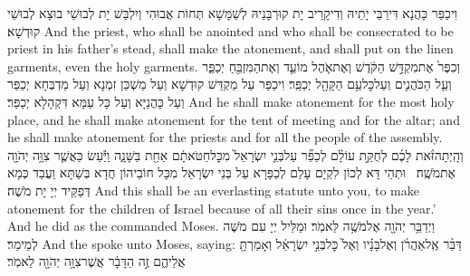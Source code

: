 {וִיכַפַּר כָּהֲנָא דִּירַבֵּי יָתֵיהּ וְדִיקָרֵיב יָת קוּרְבָּנֵיהּ לְשַׁמָּשָׁא תְּחוֹת אֲבוּהִי וְיִלְבַּשׁ יָת לְבוּשֵׁי בוּצָא לְבוּשֵׁי קוּדְשָׁא׃}
{And the priest, who shall be anointed and who shall be consecrated to be priest in his father’s stead, shall make the atonement, and shall put on the linen garments, even the holy garments.}{}
{וְכִפֶּר֙ אֶת\maqqaf מִקְדַּ֣שׁ הַקֹּ֔דֶשׁ וְאֶת\maqqaf אֹ֧הֶל מוֹעֵ֛ד וְאֶת\maqqaf הַמִּזְבֵּ֖חַ יְכַפֵּ֑ר וְעַ֧ל הַכֹּהֲנִ֛ים וְעַל\maqqaf כׇּל\maqqaf עַ֥ם הַקָּהָ֖ל יְכַפֵּֽר׃}
{וִיכַפַּר עַל מַקְדַּשׁ קוּדְשָׁא וְעַל מַשְׁכַּן זִמְנָא וְעַל מַדְבְּחָא יְכַפַּר וְעַל כָּהֲנַיָּא וְעַל כָּל עַמָּא דִּקְהָלָא יְכַפַּר׃}
{And he shall make atonement for the most holy place, and he shall make atonement for the tent of meeting and for the altar; and he shall make atonement for the priests and for all the people of the assembly.}{}
{וְהָֽיְתָה\maqqaf זֹּ֨את לָכֶ֜ם לְחֻקַּ֣ת עוֹלָ֗ם לְכַפֵּ֞ר עַל\maqqaf בְּנֵ֤י יִשְׂרָאֵל֙ מִכׇּל\maqqaf חַטֹּאתָ֔ם אַחַ֖ת בַּשָּׁנָ֑ה וַיַּ֕עַשׂ כַּאֲשֶׁ֛ר צִוָּ֥ה יְהֹוָ֖ה אֶת\maqqaf מֹשֶֽׁה׃ \petucha }
{וּתְהֵי דָּא לְכוֹן לִקְיָם עָלַם לְכַפָּרָא עַל בְּנֵי יִשְׂרָאֵל מִכָּל חוֹבֵיהוֹן חֲדָא בְּשַׁתָּא וַעֲבַד כְּמָא דְּפַקֵּיד יְיָ יָת מֹשֶׁה׃}
{And this shall be an everlasting statute unto you, to make atonement for the children of Israel because of all their sins once in the year.’ And he did as the \lord\space commanded Moses.}{}
\newperek
{}
{וַיְדַבֵּ֥ר יְהֹוָ֖ה אֶל\maqqaf מֹשֶׁ֥ה לֵּאמֹֽר׃}
{וּמַלֵּיל יְיָ עִם מֹשֶׁה לְמֵימַר׃}
{And the \lord\space spoke unto Moses, saying:}{}
{דַּבֵּ֨ר אֶֽל\maqqaf אַהֲרֹ֜ן וְאֶל\maqqaf בָּנָ֗יו וְאֶל֙ כׇּל\maqqaf בְּנֵ֣י יִשְׂרָאֵ֔ל וְאָמַרְתָּ֖ אֲלֵיהֶ֑ם זֶ֣ה הַדָּבָ֔ר אֲשֶׁר\maqqaf צִוָּ֥ה יְהֹוָ֖ה לֵאמֹֽר׃}
